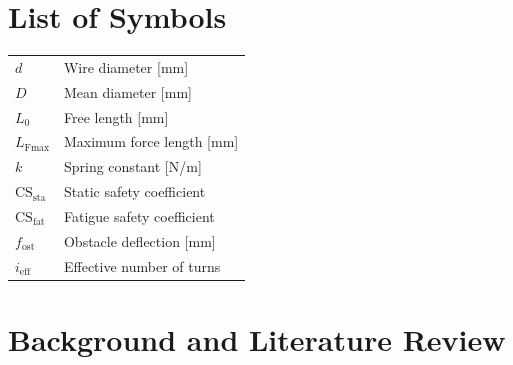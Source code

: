\documentclass[11pt]{article}
\begin{document}
\newpage
\thispagestyle{empty}

\section*{List of Symbols}
\begin{tabular}{ll}
    $d$ & Wire diameter [mm] \\
    $D$ & Mean diameter [mm] \\
    $L_0$ & Free length [mm] \\
    $L_\text{Fmax}$ & Maximum force length [mm] \\
    $k$ & Spring constant [N/m] \\
    $\text{CS}_\text{sta}$ & Static safety coefficient \\
    $\text{CS}_\text{fat}$ & Fatigue safety coefficient \\
    $f_\text{ost}$ & Obstacle deflection [mm] \\
    $i_\text{eff}$ & Effective number of turns \\
\end{tabular}

\newpage
\section{Background and Literature Review}
\end{document}
